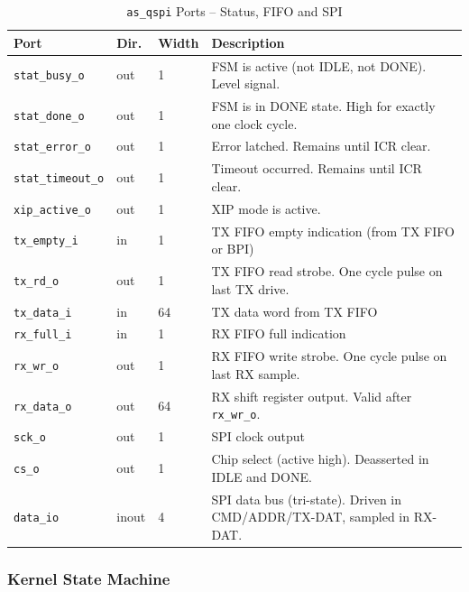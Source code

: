 \begin{table}[H]
\caption{\texttt{as\_qspi} Ports -- Status, FIFO and SPI}
\label{tab:asqspi_ports2}
\centering
\begin{tabularx}{\textwidth}{|l|l|l|X|}
  \hline
  Port & Dir. & Width & Description \\
  \hline\hline
  \texttt{stat\_busy\_o}    & out & 1  & FSM is active (not IDLE, not DONE). Level signal. \\
  \hline
  \texttt{stat\_done\_o}    & out & 1  & FSM is in DONE state. High for exactly one clock cycle. \\
  \hline
  \texttt{stat\_error\_o}   & out & 1  & Error latched. Remains until ICR clear. \\
  \hline
  \texttt{stat\_timeout\_o} & out & 1  & Timeout occurred. Remains until ICR clear. \\
  \hline
  \texttt{xip\_active\_o}   & out & 1  & XIP mode is active. \\
  \hline
  \texttt{tx\_empty\_i}     & in  & 1  & TX FIFO empty indication (from TX FIFO or BPI) \\
  \hline
  \texttt{tx\_rd\_o}        & out & 1  & TX FIFO read strobe. One cycle pulse on last TX drive. \\
  \hline
  \texttt{tx\_data\_i}      & in  & 64 & TX data word from TX FIFO \\
  \hline
  \texttt{rx\_full\_i}      & in  & 1  & RX FIFO full indication \\
  \hline
  \texttt{rx\_wr\_o}        & out & 1  & RX FIFO write strobe. One cycle pulse on last RX sample. \\
  \hline
  \texttt{rx\_data\_o}      & out & 64 & RX shift register output. Valid after \texttt{rx\_wr\_o}. \\
  \hline
  \texttt{sck\_o}           & out & 1  & SPI clock output \\
  \hline
  \texttt{cs\_o}            & out & 1  & Chip select (active high). Deasserted in IDLE and DONE. \\
  \hline
  \texttt{data\_io}         & inout & 4 & SPI data bus (tri-state). Driven in CMD/ADDR/TX-DAT, sampled in RX-DAT. \\
  \hline
\end{tabularx}
\end{table}

\subsubsection{Kernel State Machine}

